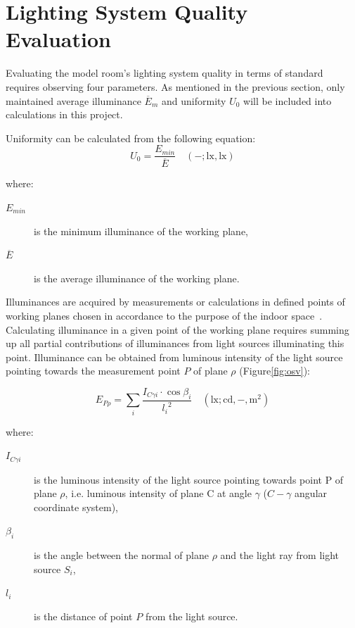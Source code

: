 \section{Lighting System Quality Evaluation}
Evaluating the model room's lighting system quality in terms of standard \cite{12464} requires observing four parameters. As mentioned in the previous section, only maintained average illuminance $\overline{E}_{m}$ and uniformity $U_{0}$ will be included into calculations in this project.

Uniformity can be calculated from the following equation:
\begin{equation}
U_{0}=\frac{E_{min}}{\overline{E}} \quad \mathrm{(-;lx,lx)}
\end{equation}

where:
\begin{description}
	\item[$E_{min}$] is the minimum illuminance of the working plane,
	\item[$\overline{E}$] is the average illuminance of the working plane.
\end{description}

Illuminances are acquired by measurements or calculations in defined points of working planes chosen in accordance to the purpose of the indoor space~\cite{12464}. Calculating illuminance in a given point of the working plane requires summing up all partial contributions of illuminances from light sources illuminating this point. Illuminance can be obtained from luminous intensity of the light source pointing towards the measurement point $P$ of plane $\rho$ (Figure\ref{fig:osv}):

\begin{equation}
E_{P\rho}=\sum_{i} \frac{I_{C \gamma i} \cdot \cos{\beta_{i}}}{{l_{i}}^{2}} \quad \mathrm{(lx;cd,-,m^{2})}
\label{eq:illSum}
\end{equation}

where:
\begin{description}
	\item[$I_{C \gamma i}$] is the luminous intensity of the light source pointing towards point P of plane $\rho$, i.e. luminous intensity of plane C at angle $\gamma$ ($C-\gamma$ angular coordinate system),
	\item[$\beta_{i}$] is the angle between the normal of plane $\rho$ and the light ray from light source $S_{i}$,
	\item[$l_{i}$] is the distance of point $P$ from the light source.
\end{description}

